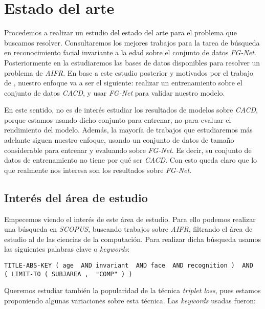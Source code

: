 \chapter{Estado del arte} \label{ich:estado_arte}

Procedemos a realizar un estudio del estado del arte para el problema que buscamos resolver. Consultaremos los mejores trabajos para la tarea de búsqueda en reconocimiento facial invariante a la edad sobre el conjunto de datos \textit{FG-Net}. Posteriormente en la  estudiaremos las bases de datos disponibles para resolver un problema de \textit{AIFR}. En base a este estudio posterior y motivados por el trabajo de \cite{informatica:best_fgnet_model}, nuestro enfoque va a ser el siguiente: realizar un entrenamiento sobre el conjunto de datos \textit{CACD}, y usar \textit{FG-Net} para validar nuestro modelo.

En este sentido, no es de interés estudiar los resultados de modelos sobre \textit{CACD}, porque estamos usando dicho conjunto para entrenar, no para evaluar el rendimiento del modelo. Además, la mayoría de trabajos que estudiaremos más adelante siguen nuestro enfoque, usando un conjunto de datos de tamaño considerable para entrenar y evaluando sobre \textit{FG-Net}. Es decir, su conjunto de datos de entrenamiento no tiene por qué ser \textit{CACD}. Con esto queda claro que lo que realmente nos interesa son los resultados sobre \textit{FG-Net}.

\section{Interés del área de estudio} \label{isec:interesareaestudio}

Empecemos viendo el interés de este área de estudio. Para ello podemos realizar una búsqueda en \textit{SCOPUS}, buscando trabajos sobre \textit{AIFR}, filtrando el área de estudio al de las ciencias de la computación. Para realizar dicha búsqueda usamos las siguientes palabras clave o \textit{keywords}:

\begin{lstlisting}[caption=\textit{Keywords usadas para la búsqueda en \textit{SCOPUS}. Búsqueda realizada el 17 de Septiembre de 2023}, label=code:scopus_search, captionpos=b]
    TITLE-ABS-KEY ( age  AND invariant  AND face  AND recognition )  AND  ( LIMIT-TO ( SUBJAREA ,  "COMP" ) )
\end{lstlisting}

Queremos estudiar también la popularidad de la técnica \textit{triplet loss}, pues estamos proponiendo algunas variaciones sobre esta técnica. Las \textit{keywords} usadas fueron:

